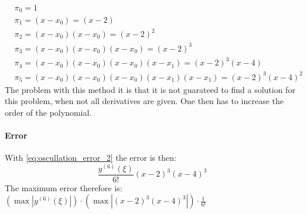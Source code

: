 \begin{equation}\label{eq:modified_newton_polynomials}
\begin{aligned}
& \pi_0=1 \\
& \pi_1=\left(x-x_0\right)=(x-2) \\
& \pi_2=\left(x-x_0\right)\left(x-x_0\right)=(x-2)^2 \\
& \pi_3=\left(x-x_0\right)\left(x-x_0\right)\left(x-x_0\right)=(x-2)^3\\
& \pi_4=\left(x-x_0\right)\left(x-x_0\right)\left(x-x_0\right)\left(x-x_1\right)=(x-2)^3(x-4) \\
& \pi_5=\left(x-x_0\right)\left(x-x_0\right)\left(x-x_0\right)\left(x-x_1\right)\left(x-x_1\right)=(x-2)^3(x-4)^2
\end{aligned}
\end{equation}
The problem with this method it is that it is not guarateed to find a solution for this problem, when not all derivatives are given. One then has to increase the order of the polynomial.\newline\newline
\paragraph{Error}
With \autoref{eq:oscullation_error_2} the error is then:
$$
\frac{y^{(6)}(\xi)}{6 !}(x-2)^3(x-4)^3
$$
The maximum error therefore is: $\left(\max \left| y^{(6)}(\xi) \right|\right)\cdot \left(\max \left|(x-2)^3(x-4)^3 \right| \right)\cdot \frac{1}{6!}$

